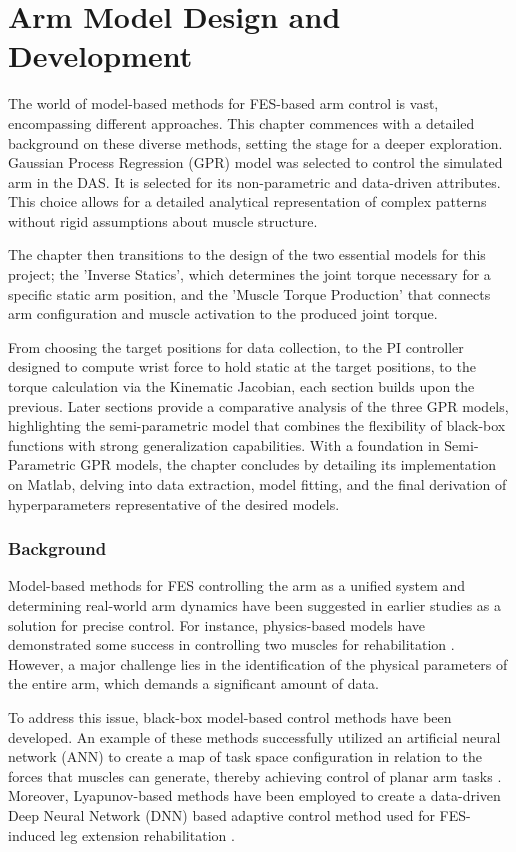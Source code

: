 \newpage
\chapter{Arm Model Design and Development}\label{sec:model}
The world of model-based methods for FES-based arm control is vast, encompassing different approaches. This chapter commences with a detailed background on these diverse methods, setting the stage for a deeper exploration. Gaussian Process Regression (GPR) model was selected to control the simulated arm in the DAS. It is selected for its non-parametric and data-driven attributes. This choice allows for a detailed analytical representation of complex patterns without rigid assumptions about muscle structure. 

The chapter then transitions to the design of the two essential models for this project; the 'Inverse Statics', which determines the joint torque necessary for a specific static arm position, and the 'Muscle Torque Production' that connects arm configuration and muscle activation to the produced joint torque. 

From choosing the target positions for data collection, to the PI controller designed to compute wrist force to hold static at the target positions, to the torque calculation via the Kinematic Jacobian, each section builds upon the previous. Later sections provide a comparative analysis of the three GPR models, highlighting the semi-parametric model that  combines the flexibility of black-box functions with strong generalization capabilities. With a foundation in Semi-Parametric GPR models, the chapter concludes by detailing its implementation on Matlab, delving into data extraction, model fitting, and the final derivation of hyperparameters representative of the desired models.

\subsection{Background}
Model-based methods for FES controlling the arm as a unified system and determining real-world arm dynamics have been suggested in earlier studies as a solution for precise control. For instance, physics-based models have demonstrated some success in controlling two muscles for rehabilitation \cite{IOL}. However, a major challenge lies in the identification of the physical parameters of the entire arm, which demands a significant amount of data.

To address this issue, black-box model-based control methods have been developed. An example of these methods successfully utilized an artificial neural network (ANN) to create a map of task space configuration in relation to the forces that muscles can generate, thereby achieving control of planar arm tasks \cite{FC2D}. Moreover, Lyapunov-based methods have been employed to create a data-driven Deep Neural Network (DNN) based adaptive control method used for FES-induced leg extension rehabilitation \cite{CLDNN}.

